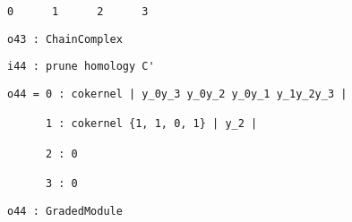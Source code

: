 \documentclass[12pt,leqno]{amsart}
\theoremstyle{definition}
\begin{document}
\begin{lstlisting}[xleftmargin=10pt, aboveskip=1.5pt, belowskip=1.5pt]
      0      1      2      3
\end{lstlisting}
\begin{lstlisting}[xleftmargin=10pt, aboveskip=1.5pt, belowskip=1.5pt] 
o43 : ChainComplex
\end{lstlisting}
\begin{lstlisting}[xleftmargin=10pt, aboveskip=1.5pt, belowskip=1.5pt] 
i44 : prune homology C'
\end{lstlisting}
\begin{lstlisting}[xleftmargin=10pt, lineskip=-10pt, aboveskip=1.5pt, belowskip=1.5pt]
o44 = 0 : cokernel | y_0y_3 y_0y_2 y_0y_1 y_1y_2y_3 |

      1 : cokernel {1, 1, 0, 1} | y_2 |              

      2 : 0                                          

      3 : 0   
\end{lstlisting}
\begin{lstlisting}[xleftmargin=10pt, aboveskip=1.5pt, belowskip=3.0pt]
o44 : GradedModule
\end{lstlisting}
\end{document}
